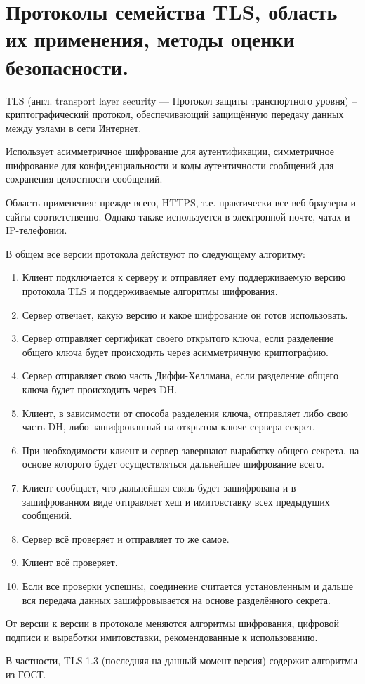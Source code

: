 \section{Протоколы семейства TLS, область их применения, методы оценки безопасности.}

TLS (англ. transport layer security — Протокол защиты транспортного уровня) -- криптографический протокол, обеспечивающий защищённую передачу данных между узлами в сети Интернет.

Использует асимметричное шифрование для аутентификации, симметричное шифрование для конфиденциальности и коды аутентичности сообщений для сохранения целостности сообщений.

Область применения: прежде всего, HTTPS, т.е. практически все веб-браузеры и сайты соответственно. Однако также используется в электронной почте, чатах и IP-телефонии.

В общем все версии протокола действуют по следующему алгоритму:

\begin{enumerate}
	\item Клиент подключается к серверу и отправляет ему поддерживаемую версию протокола TLS и поддерживаемые алгоритмы шифрования.
	\item Сервер отвечает, какую версию и какое шифрование он готов использовать.
	\item Сервер отправляет сертификат своего открытого ключа, если разделение общего ключа будет происходить через асимметричную криптографию.
	\item Сервер отправляет свою часть Диффи-Хеллмана, если разделение общего ключа будет происходить через DH.
	\item Клиент, в зависимости от способа разделения ключа, отправляет либо свою часть DH, либо зашифрованный на открытом ключе сервера секрет.
	\item При необходимости клиент и сервер завершают выработку общего секрета, на основе которого будет осуществляться дальнейшее шифрование всего.
	\item Клиент сообщает, что дальнейшая связь будет зашифрована и в зашифрованном виде отправляет хеш и имитовставку всех предыдущих сообщений.
	\item Сервер всё проверяет и отправляет то же самое.
	\item Клиент всё проверяет.
	\item Если все проверки успешны, соединение считается установленным и дальше вся передача данных зашифровывается на основе разделённого секрета. 
\end{enumerate}

От версии к версии в протоколе меняются алгоритмы шифрования, цифровой подписи и выработки имитовставки, рекомендованные к использованию. 

В частности, TLS 1.3 (последняя на данный момент версия) содержит алгоритмы из ГОСТ.